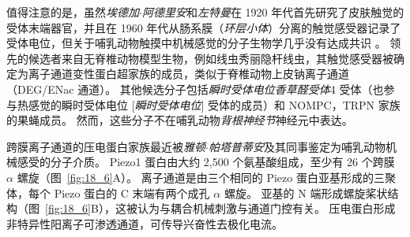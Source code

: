 值得注意的是，虽然\textit{埃德加$\cdot$阿德里安}和\textit{左特曼}在 1920 年代首先研究了皮肤触觉的受体末端器官，并且在 1960 年代从肠系膜（\textit{环层小体}）分离的触觉感受器记录了受体电位，但关于哺乳动物触摸中机械感觉的分子生物学几乎没有达成共识 。
领先的候选者来自无脊椎动物模型生物，例如线虫秀丽隐杆线虫，其触觉感受器被确定为离子通道变性蛋白超家族的成员，类似于脊椎动物上皮钠离子通道（DEG/ENac 通道）。
其他候选分子包括\textit{瞬时受体电位香草醛受体}4 受体（也参与热感觉的瞬时受体电位 [\textit{瞬时受体电位}] 受体的成员）和 NOMPC，TRPN 家族的果蝇成员。
然而，这些分子不在哺乳动物\textit{背根神经节}神经元中表达。


跨膜离子通道的压电蛋白家族最近被\textit{雅顿$\cdot$帕塔普蒂安}及其同事鉴定为哺乳动物机械感受的分子介质。
Piezo1 蛋白由大约 2,500 个氨基酸组成，至少有 26 个跨膜 $\alpha$ 螺旋（图~\ref{fig:18_6}A）。
离子通道是由三个相同的 Piezo 蛋白亚基形成的三聚体，每个 Piezo 蛋白的 C 末端有两个成孔 $\alpha$ 螺旋。
亚基的 N 端形成螺旋桨状结构（图~\ref{fig:18_6}B），这被认为与耦合机械刺激与通道门控有关。
压电蛋白形成非特异性阳离子可渗透通道，可传导兴奋性去极化电流。


